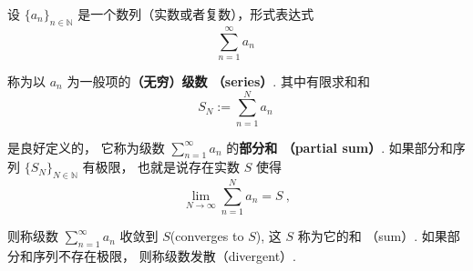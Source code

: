 


设 $\{a_n\}_{n\in\mathbb{N}}$ 是一个数列（实数或者复数），形式表达式
\begin{equation}
\sum_{n=1}^\infty a_n~
\end{equation}



称为以 $a_n$ 为一般项的\textbf{（无穷）级数 （series）}. 其中有限求和和
\begin{equation}
S_N:=\sum_{n=1}^N a_n~
\end{equation}



是良好定义的， 它称为级数 $\sum_{n=1}^\infty a_n$ 的\textbf{部分和 （partial sum）}. 如果部分和序列 $\{S_N\}_{N\in\mathbb{N}}$ 有极限， 也就是说存在实数 $S$ 使得
\begin{equation}
\lim_{N\to\infty}\sum_{n=1}^N a_n=S~,
\end{equation}


则称级数 $\sum_{n=1}^\infty a_n$ 收敛到 $S$(converges to $S$), 这 $S$ 称为它的和 （sum）. 如果部分和序列不存在极限， 则称级数发散（divergent）. 

